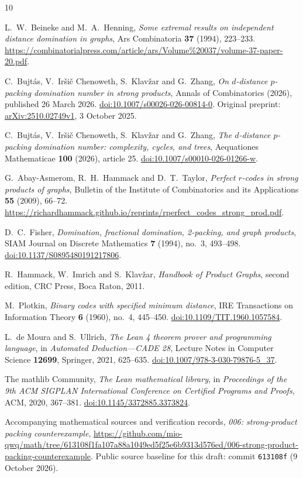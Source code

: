 \documentclass[11pt]{article}
\theoremstyle{definition}
\theoremstyle{remark}
\begin{document}
\begin{thebibliography}{10}
\raggedright
{}
L.~W.~Beineke and M.~A.~Henning,
\emph{Some extremal results on independent distance domination in graphs},
Ars Combinatoria \textbf{37} (1994), 223--233.
\url{https://combinatorialpress.com/article/ars/Volume%20037/volume-37-paper-20.pdf}.

C.~Bujt\'as, V.~Ir\v si\v c Chenoweth, S.~Klav\v zar and G.~Zhang,
\emph{On \(d\)-distance \(p\)-packing domination number in strong products},
Annals of Combinatorics (2026), published 26 March 2026.
\href{https://doi.org/10.1007/s00026-026-00814-0}
{doi:10.1007/s00026-026-00814-0}.
Original preprint:
\href{https://arxiv.org/abs/2510.02749v1}{arXiv:2510.02749v1},
3 October 2025.

C.~Bujt\'as, V.~Ir\v si\v c Chenoweth, S.~Klav\v zar and G.~Zhang,
\emph{The \(d\)-distance \(p\)-packing domination number:
complexity, cycles, and trees},
Aequationes Mathematicae \textbf{100} (2026), article 25.
\href{https://doi.org/10.1007/s00010-026-01266-w}
{doi:10.1007/s00010-026-01266-w}.

G.~Abay-Asmerom, R.~H.~Hammack and D.~T.~Taylor,
\emph{Perfect \(r\)-codes in strong products of graphs},
Bulletin of the Institute of Combinatorics and its Applications
\textbf{55} (2009), 66--72.
\url{https://richardhammack.github.io/reprints/rperfect_codes_strong_prod.pdf}.

D.~C.~Fisher,
\emph{Domination, fractional domination, 2-packing, and graph products},
SIAM Journal on Discrete Mathematics \textbf{7} (1994), no.~3, 493--498.
\href{https://doi.org/10.1137/S0895480191217806}
{doi:10.1137/S0895480191217806}.

R.~Hammack, W.~Imrich and S.~Klav\v zar,
\emph{Handbook of Product Graphs}, second edition,
CRC Press, Boca Raton, 2011.

M.~Plotkin,
\emph{Binary codes with specified minimum distance},
IRE Transactions on Information Theory \textbf{6} (1960), no.~4, 445--450.
\href{https://doi.org/10.1109/TIT.1960.1057584}
{doi:10.1109/TIT.1960.1057584}.

L.~de Moura and S.~Ullrich,
\emph{The Lean 4 theorem prover and programming language},
in \emph{Automated Deduction---CADE 28},
Lecture Notes in Computer Science \textbf{12699},
Springer, 2021, 625--635.
\href{https://doi.org/10.1007/978-3-030-79876-5_37}
{doi:10.1007/978-3-030-79876-5\_37}.

The mathlib Community,
\emph{The Lean mathematical library},
in \emph{Proceedings of the 9th ACM SIGPLAN International
Conference on Certified Programs and Proofs},
ACM, 2020, 367--381.
\href{https://doi.org/10.1145/3372885.3373824}
{doi:10.1145/3372885.3373824}.

Accompanying mathematical sources and verification records,
\emph{006: strong-product packing counterexample},
\url{https://github.com/mio-qwq/math/tree/613108f1fa107a88a1049ed5f25e6b9313d576ed/006-strong-product-packing-counterexample}.
Public source baseline for this draft:
commit \texttt{613108f} (9 October 2026).
\end{thebibliography}
\end{document}
